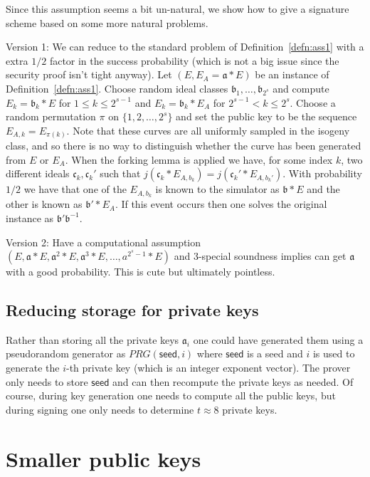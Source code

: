\documentclass{llncs}
\newcommand{\seed}{\textsf{seed}}
\renewcommand{\a}{\mathfrak{a}}
\renewcommand{\b}{\mathfrak{b}}
\renewcommand{\c}{\mathfrak{c}}
\begin{document}
Since this assumption seems a bit un-natural, we show how to give a signature scheme based on some more natural problems.

Version 1: We can reduce to the standard problem of Definition~\ref{defn:ass1} with a extra $1/2$ factor in the success probability (which is not a big issue since the security proof isn't tight anyway).
Let $(E, E_A = \a * E )$ be an instance of Definition~\ref{defn:ass1}. Choose random ideal classes $\b_1, \dots, \b_{2^s}$ and compute $E_k = \b_k * E$ for $1 \le k \le 2^{s-1}$ and $E_k = \b_k * E_A$ for $2^{s-1} < k \le 2^s$. Choose a random permutation $\pi$ on $\{ 1, 2, \dots, 2^s \}$ and set the public key to be the sequence $E_{A,k} = E_{\pi(k)}$.
Note that these curves are all uniformly sampled in the isogeny class, and so there is no way to distinguish whether the curve has been generated from $E$ or $E_A$.
When the forking lemma is applied we have, for some index $k$, two different ideals $\c_k, \c_k'$ such that $j( \c_k * E_{A, b_k} ) = j( \c_k' * E_{A, b_k'})$.
With probability $1/2$ we have that one of the $E_{A,b_k}$ is known to the simulator as  $\b * E$ and the other is known as $\b' * E_A$. If this event occurs then one solves the original instance as $\b' \b^{-1}$.

Version 2: Have a computational assumption $(E, \a * E, \a^2 * E, \a^3 * E , \dots, a^{2^s - 1} * E )$ and 3-special soundness implies can get $\a$ with a good probability. This is cute but ultimately pointless.


\subsection{Reducing storage for private keys}

Rather than storing all the private keys $\a_i$ one could have generated them using a pseudorandom generator as $PRG( \seed, i )$ where $\seed$ is a seed and $i$ is used to generate the $i$-th private key (which is an integer exponent vector).
The prover only needs to store $\seed$ and can then recompute the private keys as needed.
Of course, during key generation one needs to compute all the public keys, but during signing one only needs to determine $t \approx 8$ private keys.





\section{Smaller public keys}
\end{document}
